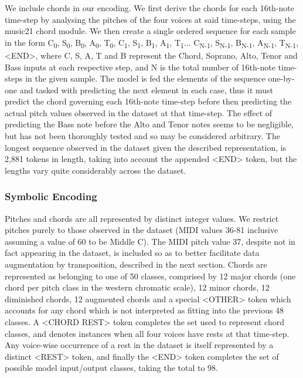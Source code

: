 \documentclass{article}
\begin{document}
We include chords in our encoding. We first derive the chords for each 16th-note time-step by analysing the pitches of the four voices at said time-steps, using the music21 chord module. We then create a single ordered sequence for each sample in the form C\textsubscript{0}, S\textsubscript{0}, B\textsubscript{0}, A\textsubscript{0}, T\textsubscript{0}, C\textsubscript{1}, S\textsubscript{1}, B\textsubscript{1}, A\textsubscript{1}, T\textsubscript{1}... C\textsubscript{N-1}, S\textsubscript{N-1}, B\textsubscript{N-1}, A\textsubscript{N-1}, T\textsubscript{N-1}, <END>, where C, S, A, T and B represent the Chord, Soprano, Alto, Tenor and Bass inputs at each respective step, and N is the total number of 16th-note time-steps in the given sample. The model is fed the elements of the sequence one-by-one and tasked with predicting the next element in each case, thus it must predict the chord governing each 16th-note time-step before then predicting the actual pitch values observed in the dataset at that time-step. The effect of predicting the Bass note before the Alto and Tenor notes seems to be negligible, but has not been thoroughly tested and so may be considered arbitrary. The longest sequence observed in the dataset given the described representation, is 2,881 tokens in length, taking into account the appended <END> token, but the lengths vary quite considerably across the dataset.

\subsubsection{Symbolic Encoding}

Pitches and chords are all represented by distinct integer values. We restrict pitches purely to those observed in the dataset (MIDI values 36-81 inclusive assuming a value of 60 to be Middle C). The MIDI pitch value 37, despite not in fact appearing in the dataset, is included so as to better facilitate data augmentation by transposition, described in the next section. Chords are represented as belonging to one of 50 classes, comprised by 12 major chords (one chord per pitch class in the western chromatic scale), 12 minor chords, 12 diminished chords, 12 augmented chords and a special <OTHER> token which accounts for any chord which is not interpreted as fitting into the previous 48 classes. A <CHORD REST> token completes the set used to represent chord classes, and denotes instances when all four voices have rests at that time-step. Any voice-wise occurrence of a rest in the dataset is itself represented by a distinct <REST> token, and finally the <END> token completes the set of possible model input/output classes, taking the total to 98.
\end{document}
